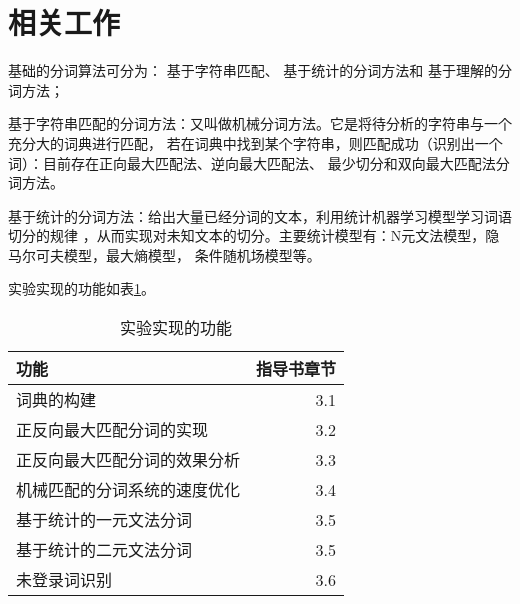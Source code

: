 \section{相关工作}

基础的分词算法可分为：
基于字符串匹配\citep{张启宇2008中文分词算法研究综述}、
基于统计的分词方法\citep{刘件2008中文分词算法研究}和
基于理解的分词方法\citep{汪文妃2018中文分词算法研究综述}；

基于字符串匹配的分词方法：又叫做机械分词方法。它是将待分析的字符串与一个充分大的词典进行匹配，
若在词典中找到某个字符串，则匹配成功（识别出一个词）：目前存在正向最大匹配法、逆向最大匹配法、
最少切分和双向最大匹配法分词方法。

基于统计的分词方法：给出大量已经分词的文本，利用统计机器学习模型学习词语切分的规律
，从而实现对未知文本的切分。主要统计模型有：N元文法模型，隐马尔可夫模型，最大熵模型，
条件随机场模型等。

实验实现的功能如表\ref{achieved-features}。

\begin{table}[H]
  \centering
  \begin{tabular}{lr}
    \hline
    \textbf{功能}                & \textbf{指导书章节} \\
    \hline
    词典的构建                   & 3.1                 \\
    正反向最大匹配分词的实现     & 3.2                 \\
    正反向最大匹配分词的效果分析 & 3.3                 \\
    机械匹配的分词系统的速度优化 & 3.4                 \\
    基于统计的一元文法分词       & 3.5                 \\
    基于统计的二元文法分词       & 3.5                 \\
    未登录词识别                 & 3.6                 \\
    \hline
  \end{tabular}
  \caption{实验实现的功能}
  \label{achieved-features}
\end{table}
